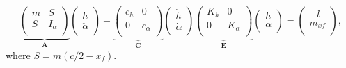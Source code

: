 \documentclass[a4paper,12pt]{article}
\begin{document}
\begin{equation}
  \underbrace{\left(\begin{array}{ccc}
    m & S \\
    S & I_\alpha \\
    \end{array} \right)}_{\boldsymbol{A}}\left(\begin{array}{c}
    \ddot{h} \\
    \ddot{\alpha} \\
    \end{array}\right)+\underbrace{\left(\begin{array}{ccc}
      c_h & 0  \\
      0 & c_\alpha \\
      \end{array}\right)}_{\boldsymbol{C}}\left(\begin{array}{l}
      \dot{h} \\
      \dot{\alpha} \\
      \end{array}\right)\underbrace{\left(\begin{array}{ccc}
    K_h & 0 \\
    0 & K_\alpha \\
    \end{array}\right)}_{\boldsymbol{E}}\left(\begin{array}{l}
    h \\
    \alpha \\
    \end{array}\right)=\left(\begin{array}{c}
    -l \\
    m_{x f} \\
    \end{array}\right),
\label{eq:system}
\end{equation}
where $S=m(c/2-x_f)$.











\end{document}
